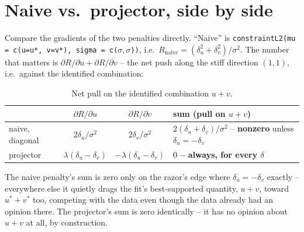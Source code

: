 \documentclass[11pt]{article}
\newcommand{\code}[1]{\texttt{#1}}
\newcommand{\stiff}[1]{\textcolor{stiffcol}{\textbf{#1}}}
\begin{document}
\section{Naive vs.\ projector, side by side}

Compare the gradients of the two penalties directly. ``Naive'' is
\code{constraintL2(mu = c(u=u*, v=v*), sigma = c(}$\sigma,\sigma$\code{))},
i.e.\ $R_{\mathrm{naive}} = (\delta_u^2+\delta_v^2)/\sigma^2$. The number
that matters is $\partial R/\partial u + \partial R/\partial v$ -- the net
push along the stiff direction $(1,1)$, i.e.\ against the identified
combination:

\begin{table}[h]
\centering
\begin{tabular}{@{}lccl@{}}
\toprule
 & $\partial R/\partial u$ & $\partial R/\partial v$ & sum (pull on $u+v$) \\
\midrule
naive, diagonal & $2\delta_u/\sigma^2$ & $2\delta_v/\sigma^2$ &
  $2(\delta_u+\delta_v)/\sigma^2$ -- \textbf{nonzero} unless $\delta_u=-\delta_v$ \\
projector & $\lambda(\delta_u-\delta_v)$ & $-\lambda(\delta_u-\delta_v)$ &
  \stiff{$0$ -- always, for every $\delta$} \\
\bottomrule
\end{tabular}
\caption{Net pull on the identified combination $u+v$.}
\end{table}

The naive penalty's sum is zero only on the razor's edge where
$\delta_u=-\delta_v$ exactly -- everywhere else it quietly drags the fit's
best-supported quantity, $u+v$, toward $u^*+v^*$ too, competing with the data
even though the data already had an opinion there. The projector's sum is
zero identically -- it has no opinion about $u+v$ at all, by construction.
\end{document}
